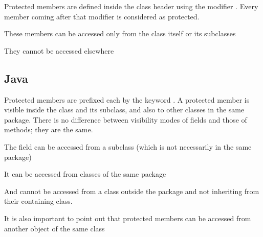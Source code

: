 \documentclass{KodeBook}
\begin{document}
Protected members are defined inside the class header using the modifier . 
Every member coming after that modifier is considered as protected.



These members can be accessed only from the class itself or its subclasses



They cannot be accessed elsewhere



\subsection{Java}

Protected members are prefixed each by the keyword . 
A protected member is visible inside the class and its subclass, and also to other classes in the same package. 
There is no difference between visibility modes of fields and those of methods; they are the same.



The field can be accessed from a subclass (which is not necessarily in the same package)



It can be accessed from classes of the same package



And cannot be accessed from a class outside the package and not inheriting from their containing class.



It is also important to point out that protected members can be accessed from another object of the same class 


\end{document}
